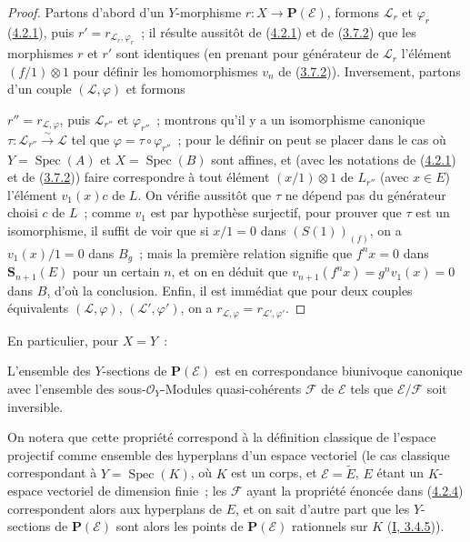 \begin{proof}
Partons d'abord d'un $Y$-morphisme $r:X\to\mathbf{P}(\mathcal{E})$, formons
$\mathcal{L}_r$ et $\varphi_r$ (\hyperref[II.4.2.1-fr]{4.2.1}), puis
$r'=r_{\mathcal{L}_r,\varphi_r}$~; il résulte aussitôt de
(\hyperref[II.4.2.1-fr]{4.2.1}) et de
(\hyperref[II.3.7.2-fr]{3.7.2}) que les morphismes $r$ et $r'$ sont
identiques (en prenant pour générateur de $\mathcal{L}_r$ l'élément
$(f/1)\otimes1$ pour définir les homomorphismes $v_n$ de
(\hyperref[II.3.7.2-fr]{3.7.2})). Inversement, partons d'un couple
$(\mathcal{L},\varphi)$ et formons


$r''=r_{\mathcal{L},\varphi}$, puis $\mathcal{L}_{r''}$ et
$\varphi_{r''}$~; montrons qu'il y a un isomorphisme canonique
$\tau:\mathcal{L}_{r''}\xrightarrow{\sim}\mathcal{L}$ tel que
$\varphi=\tau\circ\varphi_{r''}$~; pour le définir on peut se placer dans le
cas où $Y=\operatorname{Spec}(A)$ et $X=\operatorname{Spec}(B)$ sont affines,
et (avec les notations de (\hyperref[II.4.2.1-fr]{4.2.1}) et de
(\hyperref[II.3.7.2-fr]{3.7.2})) faire correspondre à tout élément
$(x/1)\otimes1$ de $L_{r''}$ (avec $x\in E$) l'élément $v_1(x)c$ de $L$. On
vérifie aussitôt que $\tau$ ne dépend pas du générateur choisi $c$ de $L$~;
comme $v_1$ est par hypothèse surjectif, pour prouver que $\tau$ est un
isomorphisme, il suffit de voir que si $x/1=0$ dans $(S(1))_{(f)}$, on a
$v_1(x)/1=0$ dans $B_g$~; mais la première relation signifie que $f^nx=0$
dans $\mathbf{S}_{n+1}(E)$ pour un certain $n$, et on en déduit que
$v_{n+1}(f^nx)=g^nv_1(x)=0$ dans $B$, d'où la conclusion. Enfin, il est
immédiat que pour deux couples équivalents $(\mathcal{L},\varphi)$,
$(\mathcal{L}',\varphi')$, on a
$r_{\mathcal{L},\varphi}=r_{\mathcal{L}',\varphi'}$.
\end{proof}

En particulier, pour $X=Y$~:

\begin{theorem}[4.2.4]
\label{II.4.2.4-fr}
L'ensemble des $Y$-sections de $\mathbf{P}(\mathcal{E})$ est en
correspondance biunivoque canonique avec l'ensemble des
sous-$\mathcal{O}_Y$-Modules quasi-cohérents $\mathcal{F}$ de $\mathcal{E}$
tels que $\mathcal{E}/\mathcal{F}$ soit inversible.
\end{theorem}

On notera que cette propriété correspond à la définition classique de
l'\og espace projectif\fg{} comme ensemble des hyperplans d'un espace
vectoriel (le cas classique correspondant à $Y=\operatorname{Spec}(K)$, où
$K$ est un corps, et $\mathcal{E}=\widetilde{E}$, $E$ étant un $K$-espace
vectoriel de dimension finie~; les $\mathcal{F}$ ayant la propriété énoncée
dans (\hyperref[II.4.2.4-fr]{4.2.4}) correspondent alors aux hyperplans de
$E$, et on sait d'autre part que les $Y$-sections de
$\mathbf{P}(\mathcal{E})$ sont alors les points de
$\mathbf{P}(\mathcal{E})$ rationnels sur $K$
(\hyperref[I.3.4.5-fr]{I, 3.4.5})).

